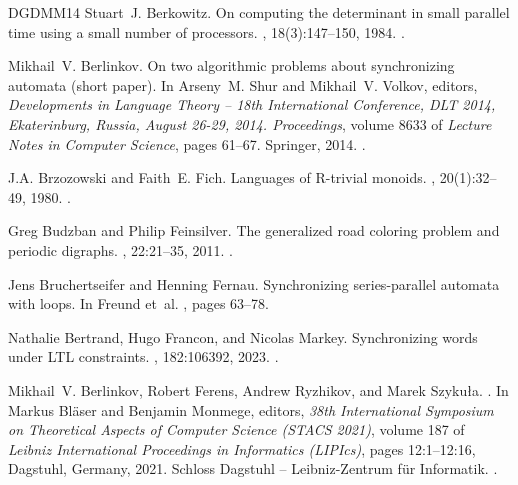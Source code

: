 \documentclass[11pt,a4paper]{amsart}
\theoremstyle{plain}
\theoremstyle{definition}
\theoremstyle{defC}
\theoremstyle{thmC}
\theoremstyle{plain}
\numberwithin{equation}{section}
\begin{document}
\begin{thebibliography}{DGDMM14}
Stuart~J. Berkowitz.
\newblock On computing the determinant in small parallel time using a small
  number of processors.
, 18(3):147--150, 1984.
\newblock \href {https://doi.org/10.1016/0020-0190(84)90018-8}
  {}.

Mikhail~V. Berlinkov.
\newblock On two algorithmic problems about synchronizing automata (short
  paper).
\newblock In Arseny~M. Shur and Mikhail~V. Volkov, editors, {\em Developments
  in Language Theory -- 18th International Conference, {DLT} 2014,
  Ekaterinburg, Russia, August 26-29, 2014. Proceedings}, volume 8633 of {\em
  Lecture Notes in Computer Science}, pages 61--67. Springer, 2014.
\newblock \href {https://doi.org/10.1007/978-3-319-09698-8\_6}
  {}.

J.A. Brzozowski and Faith~E. Fich.
\newblock Languages of {R}-trivial monoids.
, 20(1):32--49, 1980.
\newblock \href {https://doi.org/10.1016/0022-0000(80)90003-3}
  {}.

Greg Budzban and Philip Feinsilver.
\newblock The generalized road coloring problem and periodic digraphs.
,
  22:21--35, 2011.
\newblock \href {https://doi.org/10.1007/s00200-010-0135-z}
  {}.

Jens Bruchertseifer and Henning Fernau.
\newblock Synchronizing series-parallel automata with loops.
\newblock In Freund et~al. \cite{DBLP:conf/ncma/2019}, pages 63--78.

Nathalie Bertrand, Hugo Francon, and Nicolas Markey.
\newblock Synchronizing words under {LTL} constraints.
, 182:106392, 2023.
\newblock \href {https://doi.org/10.1016/j.ipl.2023.106392}
  {}.

Mikhail~V. Berlinkov, Robert Ferens, Andrew Ryzhikov, and Marek Szyku{\l}a.
.
\newblock In Markus Bl\"{a}ser and Benjamin Monmege, editors, {\em 38th
  International Symposium on Theoretical Aspects of Computer Science (STACS
  2021)}, volume 187 of {\em Leibniz International Proceedings in Informatics
  (LIPIcs)}, pages 12:1--12:16, Dagstuhl, Germany, 2021. Schloss Dagstuhl --
  Leibniz-Zentrum f{\"u}r Informatik.
\newblock \href {https://doi.org/10.4230/LIPIcs.STACS.2021.12}
  {}.


\end{thebibliography}
\end{document}
